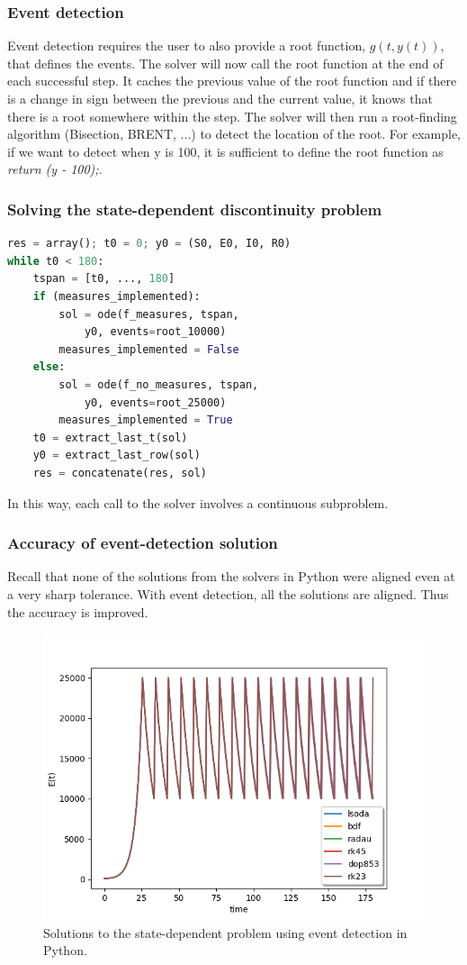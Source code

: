 \documentclass{beamer}
\begin{document}
\begin{frame}
\frametitle{Event detection}
Event detection requires the user to also provide a root function, $g(t, y(t))$, that defines the events.
\newline \newline
The solver will now call the root function at the end of each successful step.
It caches the previous value of the root function and if there is a change in sign between the previous and the current value, it knows that there is a root somewhere within the step.
\newline \newline
The solver will then run a root-finding algorithm (Bisection, BRENT, ...) to detect the location of the root.
\newline \newline
For example, if we want to detect when y is 100, it is sufficient to define the root function as \emph{return (y - 100);}. 
\end{frame}

\begin{frame}[fragile]
\frametitle{Solving the state-dependent discontinuity problem}
\begin{lstlisting}[language=Python]
res = array(); t0 = 0; y0 = (S0, E0, I0, R0)
while t0 < 180:
    tspan = [t0, ..., 180]
    if (measures_implemented):
        sol = ode(f_measures, tspan, 
            y0, events=root_10000)
        measures_implemented = False
    else:
        sol = ode(f_no_measures, tspan, 
            y0, events=root_25000)
        measures_implemented = True
    t0 = extract_last_t(sol)
    y0 = extract_last_row(sol)
    res = concatenate(res, sol)
\end{lstlisting}
In this way, each call to the solver involves a continuous subproblem.
\end{frame}

\begin{frame}
\frametitle{Accuracy of event-detection solution}
Recall that none of the solutions from the solvers in Python were aligned even at a very sharp tolerance.
With event detection, all the solutions are aligned. Thus the accuracy is improved.
\begin{figure}[H]
    \centering
    \includegraphics[width=0.7\linewidth]{./figures/solve_state_discontinuity_py}
    \caption{Solutions to the state-dependent problem using event detection in Python.}
    \label{fig:solve_state_discontinuity_py}
    \end{figure}
\end{frame}
\end{document}
